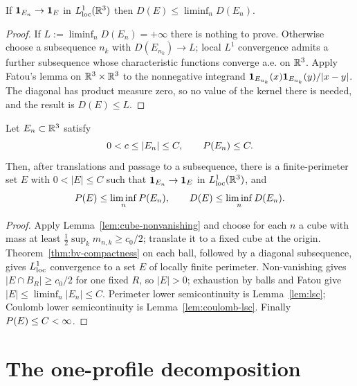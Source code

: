 \begin{lemma}\label{lem:coulomb-lsc}
If $\mathbf 1_{E_n}\to\mathbf 1_{E}$ in $L^1_{\mathrm{loc}}(\mathbb R^3)$ then
$D(E)\le\liminf_nD(E_n)$.
\end{lemma}

\begin{proof}
If $L:=\liminf_nD(E_n)=+\infty$ there is nothing to prove.  Otherwise choose
a subsequence $n_k$ with $D(E_{n_k})\to L$; local $L^1$ convergence admits a
further subsequence whose characteristic functions converge a.e. on
$\mathbb R^3$.  Apply Fatou's lemma on $\mathbb R^3\times\mathbb R^3$ to the nonnegative integrand
$\mathbf 1_{E_{n_k}}(x)\mathbf 1_{E_{n_k}}(y)/|x-y|$.  The diagonal has product measure
zero, so no value of the kernel there is needed, and the result is
$D(E)\le L$.
\end{proof}

\begin{theorem}[Compactness]\label{thm:compactness}
Let $E_n\subset\mathbb R^3$ satisfy
\begin{equation}\label{eq:compactness-hyp}
  0<c\le|E_n|\le C,\qquad P(E_n)\le C .
\end{equation}
Then, after translations and passage to a subsequence, there is a
finite-perimeter set $E$ with $0<|E|\le C$ such that
$\mathbf 1_{E_n}\to\mathbf 1_{E}$ in $L^1_{\mathrm{loc}}(\mathbb R^3)$, and
\begin{equation}\label{eq:compactness-lsc}
  P(E)\le\liminf_nP(E_n),
  \qquad
  D(E)\le\liminf_nD(E_n).
\end{equation}
\end{theorem}

\begin{proof}
Apply Lemma~\ref{lem:cube-nonvanishing} and choose for each $n$ a cube with
mass at least $\tfrac12\sup_km_{n,k}\ge c_0/2$; translate it to a fixed cube
at the origin.  Theorem~\ref{thm:bv-compactness} on each ball, followed by a
diagonal subsequence, gives $L^1_{\mathrm{loc}}$ convergence to a set $E$ of locally finite
perimeter.  Non-vanishing gives $|E\cap B_R|\ge c_0/2$ for one fixed $R$, so
$|E|>0$; exhaustion by balls and Fatou give
$|E|\le\liminf_n|E_n|\le C$.  Perimeter lower semicontinuity is
Lemma~\ref{lem:lsc}; Coulomb lower semicontinuity is
Lemma~\ref{lem:coulomb-lsc}.  Finally
$P(E)\le C<\infty$.
\end{proof}

\section{The one-profile decomposition}

